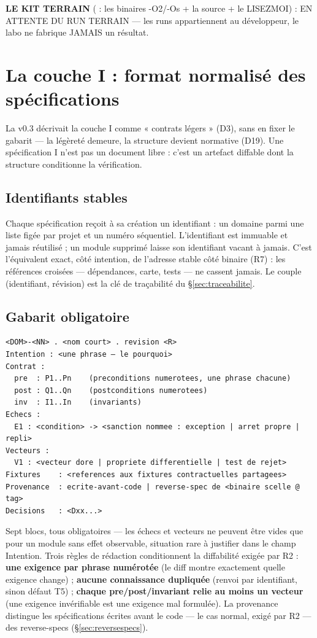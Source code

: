 \textbf{LE KIT TERRAIN} ( : les
binaires -O2/-Os + la source + le LISEZMOI) : EN ATTENTE DU RUN TERRAIN —
les runs appartiennent au développeur, le labo ne fabrique JAMAIS un
résultat.

\section{La couche I : format normalisé des spécifications}\label{sec:coucheI}

La v0.3 décrivait la couche I comme « contrats légers » (D3), sans en fixer le gabarit —
la légèreté demeure, la structure devient normative (D19). Une spécification I n’est pas un
document libre : c’est un artefact diffable dont la structure conditionne la vérification.

\subsection{Identifiants stables}

Chaque spécification reçoit à sa création un identifiant  : un domaine
parmi une liste figée par projet et un numéro séquentiel. L’identifiant est immuable et
jamais réutilisé ; un module supprimé laisse son identifiant vacant à jamais. C’est
l’équivalent exact, côté intention, de l’adresse stable côté binaire (R7) : les références
croisées — dépendances, carte, tests — ne cassent jamais. Le couple (identifiant,
révision) est la clé de traçabilité du §\ref{sec:traceabilite}.

\subsection{Gabarit obligatoire}

\begin{lstlisting}
<DOM>-<NN> . <nom court> . revision <R>
Intention : <une phrase — le pourquoi>
Contrat :
  pre  : P1..Pn    (preconditions numerotees, une phrase chacune)
  post : Q1..Qn    (postconditions numerotees)
  inv  : I1..In    (invariants)
Echecs :
  E1 : <condition> -> <sanction nommee : exception | arret propre | repli>
Vecteurs :
  V1 : <vecteur dore | propriete differentielle | test de rejet>
Fixtures    : <references aux fixtures contractuelles partagees>
Provenance  : ecrite-avant-code | reverse-spec de <binaire scelle @ tag>
Decisions   : <Dxx...>
\end{lstlisting}

Sept blocs, tous obligatoires — les échecs et vecteurs ne peuvent être vides que pour un
module sans effet observable, situation rare à justifier dans le champ Intention. Trois
règles de rédaction conditionnent la diffabilité exigée par R2 : \textbf{une exigence par
phrase numérotée} (le diff montre exactement quelle exigence change) ; \textbf{aucune
connaissance dupliquée} (renvoi par identifiant, sinon défaut T5) ; \textbf{chaque
pre/post/invariant relie au moins un vecteur} (une exigence invérifiable est une exigence
mal formulée). La provenance distingue les spécifications écrites avant le code — le cas
normal, exigé par R2 — des reverse-specs (§\ref{sec:reversespecs}).

